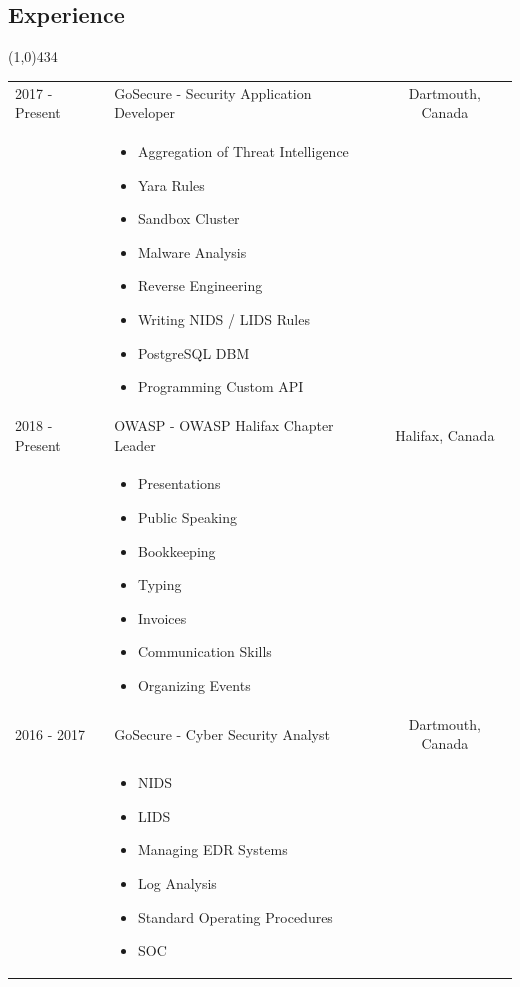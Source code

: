 \documentclass{res}
\newcommand{\frstCVcell}{2.5cm}
\begin{document}
\begin{resume}
  \section{Experience}
  \line(1,0){434}
  \newline
  \newline
  \begin{tabularx}{\textwidth}{p{\frstCVcell}Xc}
    2017 - Present & GoSecure - Security Application Developer & Dartmouth, Canada\\
    &
    \begin{itemize}
    \item Aggregation of Threat Intelligence
    \item Yara Rules
    \item Sandbox Cluster
    \item Malware Analysis
    \item Reverse Engineering
    \item Writing NIDS / LIDS Rules
    \item PostgreSQL DBM
    \item Programming Custom API
    \end{itemize}
    & \\
    2018 - Present & OWASP - OWASP Halifax Chapter Leader & Halifax, Canada\\
    &
    \begin{itemize}
    \item Presentations
    \item Public Speaking
    \item Bookkeeping
    \item Typing
    \item Invoices
    \item Communication Skills
    \item Organizing Events
    \end{itemize}
    & \\
    2016 - 2017 & GoSecure - Cyber Security Analyst & Dartmouth, Canada\\
    &
    \begin{itemize}
    \item NIDS
    \item LIDS
    \item Managing EDR Systems
    \item Log Analysis
    \item Standard Operating Procedures
    \item SOC
    \end{itemize}

\end{tabularx}
\end{resume}
\end{document}

